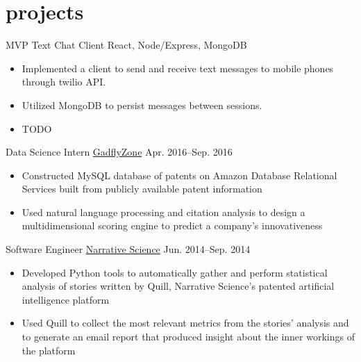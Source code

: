 
\section{projects}

\begin{entrylist}


\entry
{MVP}
{Text Chat Client}
{React, Node/Express, MongoDB}
{\begin{itemize}
\item Implemented a client to send and receive text messages to mobile phones through twilio API.  
\item Utilized MongoDB to persist messages between sessions. 
\item TODO

\end{itemize}}


\entry
{Data Science Intern}
{\href{http://gadflyzone.com/}{GadflyZone}}
{Apr. 2016--Sep. 2016}
{\begin{itemize}
\item Constructed MySQL database of patents on Amazon Database Relational Services built from publicly available patent information
\item Used natural language processing and citation analysis to design a multidimensional scoring engine to predict a company's innovativeness
\end{itemize}}


\entry
{Software Engineer}
{\href{https://narrativescience.com/}{Narrative Science}}
{Jun. 2014--Sep. 2014}
{\begin{itemize}
\item Developed Python tools to automatically gather and perform statistical analysis of stories written by Quill, Narrative Science's patented artificial intelligence platform
\item Used Quill to collect the most relevant metrics from the stories' analysis and to generate an email report that produced insight about the inner workings of the platform
\end{itemize}}


\end{entrylist}
